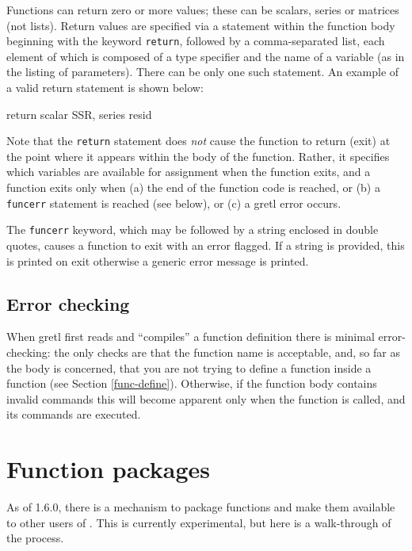 Functions can return zero or more values; these can be scalars, series
or matrices (not lists).  Return values are specified via a statement
within the function body beginning with the keyword \verb+return+,
followed by a comma-separated list, each element of which is composed
of a type specifier and the name of a variable (as in the listing of
parameters).  There can be only one such statement.  An example of a
valid return statement is shown below:
    
\begin{code}
      return scalar SSR, series resid
\end{code}

Note that the \verb+return+ statement does \emph{not} cause the
function to return (exit) at the point where it appears within the
body of the function. Rather, it specifies which variables are
available for assignment when the function exits, and a function exits
only when (a) the end of the function code is reached, or (b) a
\verb+funcerr+ statement is reached (see below), or (c) a gretl error
occurs.
    
The \verb+funcerr+ keyword, which may be followed by a string enclosed
in double quotes, causes a function to exit with an error flagged.  If
a string is provided, this is printed on exit otherwise a generic
error message is printed.
    

\subsection{Error checking}

When gretl first reads and ``compiles'' a function definition there is
minimal error-checking: the only checks are that the function name is
acceptable, and, so far as the body is concerned, that you are not
trying to define a function inside a function (see Section
\ref{func-define}). Otherwise, if the function body contains invalid
commands this will become apparent only when the function is called,
and its commands are executed.

\section{Function packages}
\label{func-packages}

As of  1.6.0, there is a mechanism to package functions and
make them available to other users of .  This is currently
experimental, but here is a walk-through of the process.

